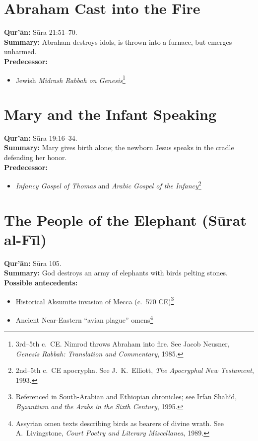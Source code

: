 \documentclass[11pt,a4paper]{article}
\begin{document}
\section{Abraham Cast into the Fire}
\textbf{Qur’ān:} Sūra 21:51–70.\\
\textbf{Summary:} Abraham destroys idols, is thrown into a furnace, but emerges unharmed.\\
\textbf{Predecessor:}
\begin{itemize}
  \item Jewish \emph{Midrash Rabbah on Genesis}\footnote{3rd–5th c.\ CE. Nimrod throws Abraham into fire. See Jacob Neusner, \emph{Genesis Rabbah: Translation and Commentary}, 1985.}
\end{itemize}

\section{Mary and the Infant Speaking}
\textbf{Qur’ān:} Sūra 19:16–34.\\
\textbf{Summary:} Mary gives birth alone; the newborn Jesus speaks in the cradle defending her honor.\\
\textbf{Predecessor:}
\begin{itemize}
  \item \emph{Infancy Gospel of Thomas} and \emph{Arabic Gospel of the Infancy}\footnote{2nd–5th c.\ CE apocrypha. See J.\ K.\ Elliott, \emph{The Apocryphal New Testament}, 1993.}
\end{itemize}

\section{The People of the Elephant (Sūrat al-Fīl)}
\textbf{Qur’ān:} Sūra 105.\\
\textbf{Summary:} God destroys an army of elephants with birds pelting stones.\\
\textbf{Possible antecedents:}
\begin{itemize}
  \item Historical Aksumite invasion of Mecca (c.\ 570 CE)\footnote{Referenced in South-Arabian and Ethiopian chronicles; see Irfan Shahîd, \emph{Byzantium and the Arabs in the Sixth Century}, 1995.}
  \item Ancient Near-Eastern “avian plague” omens\footnote{Assyrian omen texts describing birds as bearers of divine wrath. See A.\ Livingstone, \emph{Court Poetry and Literary Miscellanea}, 1989.}
\end{itemize}
\end{document}
